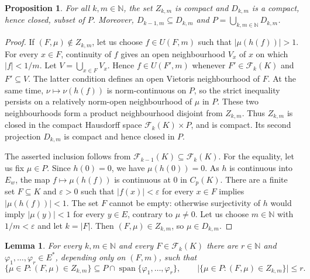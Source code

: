 \documentclass[10pt,a4paper]{amsart}
\newtheorem{proposition}[theorem]{Proposition}
\newtheorem{lemma}[theorem]{Lemma}
\newcommand{\N}{\mathbb{N}}
\newcommand{\abs}[1]{\lvert #1\rvert}
\newcommand{\Fin}{\mathcal F}
\begin{document}
\begin{proposition}\label{prop:closed-cover}
For all $k,m\in\N$, the set $Z_{k,m}$ is compact and $D_{k,m}$ is a
compact, hence closed, subset of $P$.  Moreover,
$D_{k-1,m}\subseteq D_{k,m}$ and
$P=\bigcup_{k,m\in\N}D_{k,m}$.
\end{proposition}

\begin{proof}
If $(F,\mu)\notin Z_{k,m}$, let us choose $f\in U(F,m)$ such that
$\abs{\mu(h(f))}>1$.
For every $x\in F$, continuity of $f$ gives an open neighbourhood
$V_x$ of $x$ on which $\abs f<1/m$.  Let
$V=\bigcup_{x\in F}V_x$.  Hence $f\in U(F',m)$ whenever
$F'\in\Fin_k(K)$ and $F'\subseteq V$.  The latter condition defines an
open Vietoris neighbourhood of $F$.  At the same time,
$\nu\mapsto\nu(h(f))$ is norm-continuous on $P$, so the strict inequality
persists on a relatively norm-open neighbourhood of $\mu$ in $P$.
These two neighbourhoods form a product
neighbourhood disjoint from $Z_{k,m}$.  Thus $Z_{k,m}$ is closed in the
compact Hausdorff space $\Fin_k(K)\times P$, and is compact.  Its second
projection $D_{k,m}$ is compact and hence closed in $P$.

The asserted inclusion follows from
$\Fin_{k-1}(K)\subseteq\Fin_k(K)$.  For the equality, let us fix $\mu\in P$.
Since $h(0)=0$, we have $\mu(h(0))=0$.  As $h$ is continuous into
$E_w$, the map
$f\mapsto\mu(h(f))$ is continuous at $0$ in $C_p(K)$.  There are a
finite set $F\subseteq K$
and $\varepsilon>0$ such that $\abs{f(x)}<\varepsilon$ for every
$x\in F$ implies $\abs{\mu(h(f))}<1$.
The set $F$ cannot be empty: otherwise surjectivity of $h$ would imply
$\abs{\mu(y)}<1$ for every $y\in E$, contrary to $\mu\ne0$.  Let us choose
$m\in\N$ with $1/m<\varepsilon$ and let $k=\abs F$.  Then
$(F,\mu)\in Z_{k,m}$, so $\mu\in D_{k,m}$.
\end{proof}


\begin{lemma}\label{lem:fixed-support}
For every $k,m\in\N$ and every $F\in\Fin_k(K)$ there are
$r\in\N$ and $\varphi_1,\ldots,\varphi_r\in E^*$, depending only on $(F,m)$,
such that
\[
 \{\mu\in P:(F,\mu)\in Z_{k,m}\}
 \subseteq P\cap\operatorname{span}\{\varphi_1,\ldots,\varphi_r\},
 \qquad
 \abs{\{\mu\in P:(F,\mu)\in Z_{k,m}\}}\leqslant r.
\]
\end{lemma}
\end{document}
